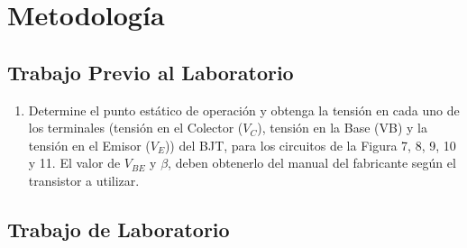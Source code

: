 \documentclass[10pt, a4paper]{article}
\begin{document}
    \newpage

    \section{Metodología}

    \subsection{Trabajo Previo al Laboratorio}

    \begin{enumerate}
        \item 	Determine el punto estático de operación y obtenga la tensión en cada uno de los terminales (tensión en el Colector ($V_C$), tensión en la Base (VB) y la tensión en el Emisor ($V_E$)) del BJT, para los circuitos de la Figura 7, 8, 9, 10 y 11. El valor de $V_{BE}$ y $\beta$, deben obtenerlo del manual del fabricante según el transistor a utilizar.
    \end{enumerate}

    \subsection{Trabajo de Laboratorio}
\end{document}
